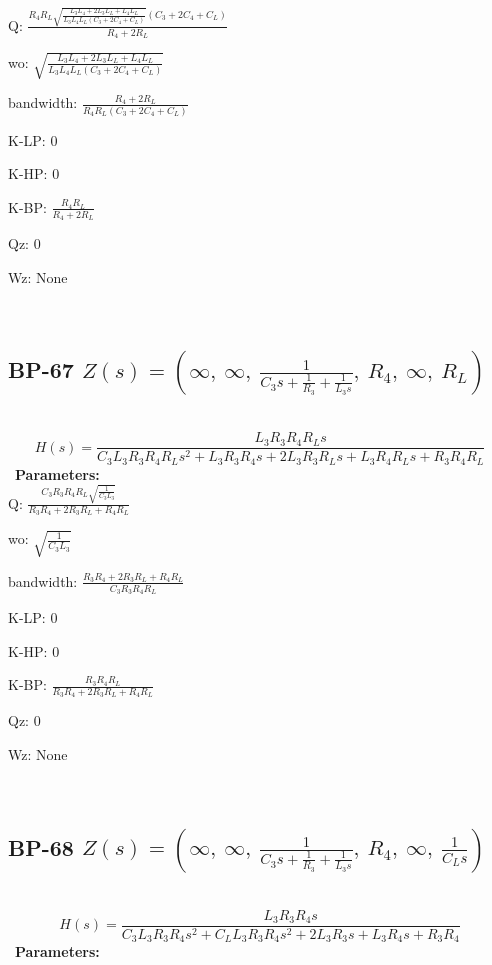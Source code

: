 \documentclass{article}
\begin{document}
Q: $\frac{R_{4} R_{L} \sqrt{\frac{L_{3} L_{4} + 2 L_{3} L_{L} + L_{4} L_{L}}{L_{3} L_{4} L_{L} \left(C_{3} + 2 C_{4} + C_{L}\right)}} \left(C_{3} + 2 C_{4} + C_{L}\right)}{R_{4} + 2 R_{L}}$\ 

wo: $\sqrt{\frac{L_{3} L_{4} + 2 L_{3} L_{L} + L_{4} L_{L}}{L_{3} L_{4} L_{L} \left(C_{3} + 2 C_{4} + C_{L}\right)}}$\ 

bandwidth: $\frac{R_{4} + 2 R_{L}}{R_{4} R_{L} \left(C_{3} + 2 C_{4} + C_{L}\right)}$\ 

K-LP: $0$\ 

K-HP: $0$\ 

K-BP: $\frac{R_{4} R_{L}}{R_{4} + 2 R_{L}}$\ 

Qz: $0$\ 

Wz: $\text{None}$\ 

\ 

\subsection{BP-67 $Z(s) = \left( \infty, \  \infty, \  \frac{1}{C_{3} s + \frac{1}{R_{3}} + \frac{1}{L_{3} s}}, \  R_{4}, \  \infty, \  R_{L}\right)$ } \ 
\textbf{\[H(s) = \frac{L_{3} R_{3} R_{4} R_{L} s}{C_{3} L_{3} R_{3} R_{4} R_{L} s^{2} + L_{3} R_{3} R_{4} s + 2 L_{3} R_{3} R_{L} s + L_{3} R_{4} R_{L} s + R_{3} R_{4} R_{L}}\] } \ 
\textbf{Parameters:}\\ 

Q: $\frac{C_{3} R_{3} R_{4} R_{L} \sqrt{\frac{1}{C_{3} L_{3}}}}{R_{3} R_{4} + 2 R_{3} R_{L} + R_{4} R_{L}}$\ 

wo: $\sqrt{\frac{1}{C_{3} L_{3}}}$\ 

bandwidth: $\frac{R_{3} R_{4} + 2 R_{3} R_{L} + R_{4} R_{L}}{C_{3} R_{3} R_{4} R_{L}}$\ 

K-LP: $0$\ 

K-HP: $0$\ 

K-BP: $\frac{R_{3} R_{4} R_{L}}{R_{3} R_{4} + 2 R_{3} R_{L} + R_{4} R_{L}}$\ 

Qz: $0$\ 

Wz: $\text{None}$\ 

\ 

\subsection{BP-68 $Z(s) = \left( \infty, \  \infty, \  \frac{1}{C_{3} s + \frac{1}{R_{3}} + \frac{1}{L_{3} s}}, \  R_{4}, \  \infty, \  \frac{1}{C_{L} s}\right)$ } \ 
\textbf{\[H(s) = \frac{L_{3} R_{3} R_{4} s}{C_{3} L_{3} R_{3} R_{4} s^{2} + C_{L} L_{3} R_{3} R_{4} s^{2} + 2 L_{3} R_{3} s + L_{3} R_{4} s + R_{3} R_{4}}\] } \ 
\textbf{Parameters:}\\ 
\end{document}
